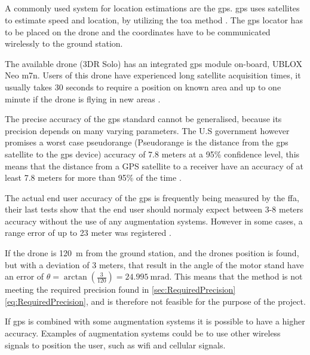 \subsection{}
A commonly used system for location estimations are the \gls{gps}. \gls{gps} uses satellites to estimate speed and location, by utilizing the \gls{toa} method \cite{web:GPSUseTOA}. The \gls{gps} locator has to be placed on the drone and the coordinates have to be communicated wirelessly to the ground station.

The available drone (3DR Solo) has an integrated \gls{gps} module on-board, UBLOX Neo m7n. Users of this drone have 
experienced long satellite acquisition times, it usually takes 30 seconds to require a position on known area and up to one minute if the drone is flying in new areas \citep{datasheet:NEO7}. %

The precise accuracy of the \gls{gps} standard cannot be generalised, because its precision depends on many varying parameters. The U.S government however promises a worst case pseudorange (Pseudorange is the distance from the \gls{gps} satellite to the \gls{gps} device) accuracy of 7.8 meters at a 95\% confidence level, this means that the distance from a GPS satellite to a receiver have an accuracy of at least 7.8 meters for more than 95\% of the time \citep{web:USofAsGPSAccuracy}. 

The actual end user accuracy of the \gls{gps} is frequently being measured by the \gls{ffa}, their last tests show that the end user should normaly expect between 3-8 meters accuracy without the use of any augmentation systems. However in some cases, a range error of up to 23 meter was registered \citep{web:FFAGPSAccuracy}.

If the drone is \SI{120}{\meter} from the ground station, and the drones position is found, but with a deviation of 3 meters, that result in the angle of the motor stand have an error of $\theta = \arctan\left(\frac{3}{120}\right) = \SI{24.995}{\milli\radian}$. This means that the  method is not meeting the required precision found in \autoref{sec:RequiredPrecision} \autoref{eq:RequiredPrecision}, and is therefore not feasible for the purpose of the project. 

If \gls{gps} is combined with some augmentation systems it is possible to have a higher accuracy. Examples of augmentation systems could be to use other wireless signals to position the user, such as wifi and cellular signals. 

